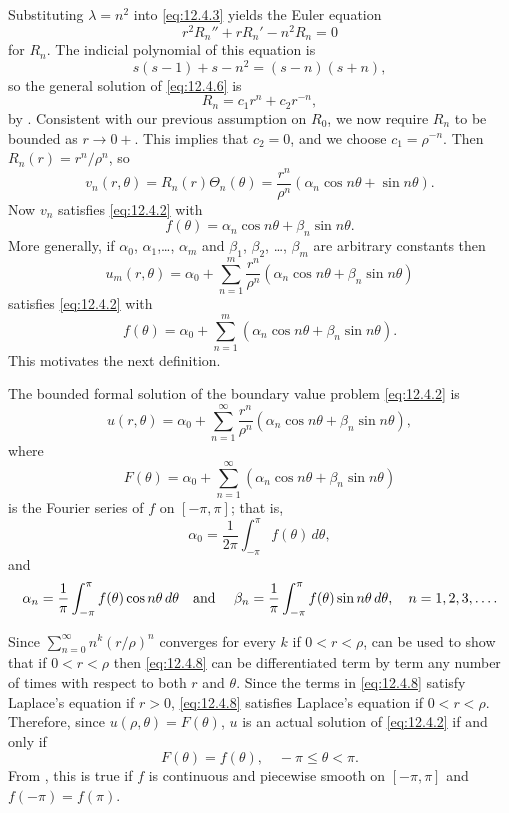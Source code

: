 Substituting $\lambda=n^2$ into \eqref{eq:12.4.3} yields
the Euler equation
\begin{equation} \label{eq:12.4.6}
r^2R_n''+rR_n'-n^2 R_n=0
\end{equation}
for $R_n$.
The indicial polynomial of this equation is
\[
s(s-1)+s-n^2=(s-n)(s+n),
\]
so the general solution of \eqref{eq:12.4.6} is
\begin{equation} \label{eq:12.4.7}
R_n=c_1r^n+c_2r^{-n},
\end{equation}
by . Consistent with our previous assumption on
$R_0$, we now require  $R_n$  to be bounded as $r\to0+$.
This implies that  $c_2=0$, and we   choose
$c_1=\rho^{-n}$.
Then
$R_n(r)=r^n/\rho^n$, so
\[
v_n(r,\theta)=R_n(r)\Theta_n(\theta)=\frac{r^n}{\rho^n}(\alpha_n\cos
n\theta+\sin n\theta).
\]
Now  $v_n$ satisfies \eqref{eq:12.4.2} with
\[
f(\theta)=\alpha_n\cos n\theta+\beta_n\sin n\theta.
\]
More generally, if $\alpha_0$, $\alpha_1$,\dots, $\alpha_m$ and
$\beta_1$,
$\beta_2$,
\dots, $\beta_m$ are arbitrary constants then
\[
u_m(r,\theta)=\alpha_0+\sum_{n=1}^m\frac{r^n}{\rho^n}(\alpha_n\cos
n\theta+\beta_n\sin n\theta)
\]
satisfies \eqref{eq:12.4.2} with
\[
f(\theta)
=\alpha_0+\sum_{n=1}^m(\alpha_n\cos
n\theta+\beta_n\sin n\theta).
\]
This motivates the next definition.

\begin{definition}\label{thmtype:12.4.1}
The bounded formal solution of the boundary value problem
\eqref{eq:12.4.2} is
\begin{equation} \label{eq:12.4.8}
u(r,\theta)=\alpha_0+\sum_{n=1}^\infty\frac{r^n}{\rho^n}(\alpha_n\cos
n\theta+\beta_n\sin n\theta),
\end{equation}
where
\[
F(\theta)
=\alpha_0+\sum_{n=1}^\infty(\alpha_n\cos
n\theta+\beta_n\sin n\theta)
\]
is the Fourier series of  $f$ on $[-\pi,\pi]$; that is,
\[
\alpha_0=\frac{1}{2\pi}\int_{-\pi}^\pi f(\theta)\,d\theta,
\]
and
\[
\alpha_n=\frac{1}{\pi}\int_{-\pi}^\pi f(\theta)\cos n\theta\,d\theta
\text{\quad and \quad}
\beta_n=\frac{1}{\pi}\int_{-\pi}^\pi f(\theta)\sin
n\theta\,d\theta,
\quad n=1,2,3,\dots.
\]
\end{definition}

Since $\sum_{n=0}^\infty n^k(r/\rho)^n$  converges for every
$k$ if $0< r<\rho$,  can be used to show that if
$0< r<\rho$ then
 \eqref{eq:12.4.8} can be differentiated term by term
any number of times with respect to both $r$ and $\theta$.
Since the  terms in \eqref{eq:12.4.8} satisfy Laplace's
equation if $r>0$,  \eqref{eq:12.4.8} satisfies
Laplace's equation if $0<r<\rho$. Therefore, since
$u(\rho,\theta)=F(\theta)$,
$u$ is an actual solution of \eqref{eq:12.4.2} if and only if
\[
F(\theta)=f(\theta),\quad -\pi\le\theta<\pi.
\]
From , this is true if $f$ is continuous and piecewise
smooth on $[-\pi,\pi]$ and $f(-\pi)=f(\pi)$.

